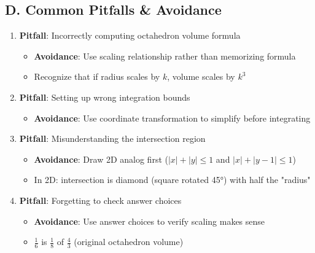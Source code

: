 \documentclass[11pt]{article}
\begin{document}
\begin{roadmapbox}
\subsection*{D. Common Pitfalls \& Avoidance}
\begin{enumerate}[leftmargin=*]
    \item \textbf{Pitfall}: Incorrectly computing octahedron volume formula
    \begin{itemize}
        \item \textbf{Avoidance}: Use scaling relationship rather than memorizing formula
        \item Recognize that if radius scales by $k$, volume scales by $k^3$
    \end{itemize}
    \item \textbf{Pitfall}: Setting up wrong integration bounds
    \begin{itemize}
        \item \textbf{Avoidance}: Use coordinate transformation to simplify before integrating
    \end{itemize}
    \item \textbf{Pitfall}: Misunderstanding the intersection region
    \begin{itemize}
        \item \textbf{Avoidance}: Draw 2D analog first ($|x|+|y|\le1$ and $|x|+|y-1|\le1$)
        \item In 2D: intersection is diamond (square rotated 45°) with half the "radius"
    \end{itemize}
    \item \textbf{Pitfall}: Forgetting to check answer choices
    \begin{itemize}
        \item \textbf{Avoidance}: Use answer choices to verify scaling makes sense
        \item $\frac{1}{6}$ is $\frac{1}{8}$ of $\frac{4}{3}$ (original octahedron volume)
    \end{itemize}
\end{enumerate}
\end{roadmapbox}
\end{document}
